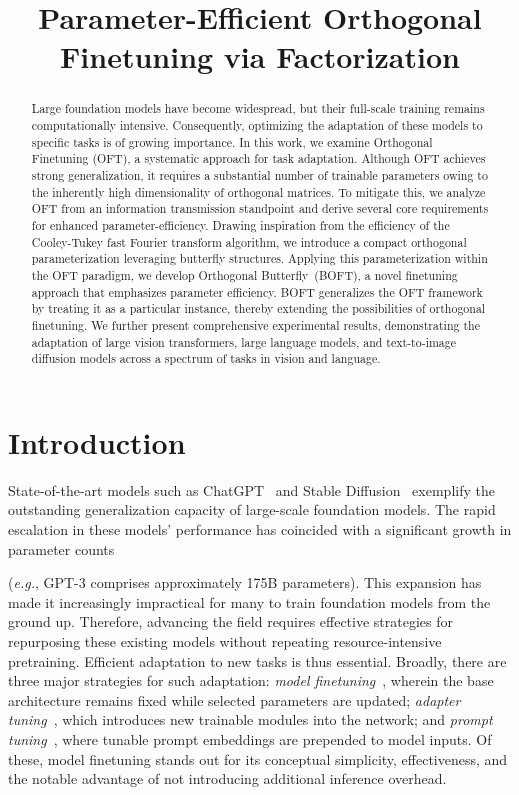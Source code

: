 \title{Parameter-Efficient Orthogonal Finetuning via Factorization}

\begin{abstract}
Large foundation models have become widespread, but their full-scale training remains computationally intensive. Consequently, optimizing the adaptation of these models to specific tasks is of growing importance. In this work, we examine Orthogonal Finetuning (OFT), a systematic approach for task adaptation. Although OFT achieves strong generalization, it requires a substantial number of trainable parameters owing to the inherently high dimensionality of orthogonal matrices. To mitigate this, we analyze OFT from an information transmission standpoint and derive several core requirements for enhanced parameter-efficiency. Drawing inspiration from the efficiency of the Cooley-Tukey fast Fourier transform algorithm, we introduce a compact orthogonal parameterization leveraging butterfly structures. Applying this parameterization within the OFT paradigm, we develop Orthogonal Butterfly~(BOFT), a novel finetuning approach that emphasizes parameter efficiency. BOFT generalizes the OFT framework by treating it as a particular instance, thereby extending the possibilities of orthogonal finetuning. We further present comprehensive experimental results, demonstrating the adaptation of large vision transformers, large language models, and text-to-image diffusion models across a spectrum of tasks in vision and language.
\end{abstract}

\section{Introduction}

State-of-the-art models such as ChatGPT~\cite{brown2020language,chen2021evaluating} and Stable Diffusion~\cite{rombach2022high} exemplify the outstanding generalization capacity of large-scale foundation models. The rapid escalation in these models' performance has coincided with a significant growth in parameter counts

(\emph{e.g.}, GPT-3 comprises approximately 175B parameters). This expansion has made it increasingly impractical for many to train foundation models from the ground up. Therefore, advancing the field requires effective strategies for repurposing these existing models without repeating resource-intensive pretraining. Efficient adaptation to new tasks is thus essential. Broadly, there are three major strategies for such adaptation: \emph{model finetuning}~\cite{hulora2022,zaken2022bitfit,guo2020parameter,raffel2020exploring,qiu2023controlling,zhang2022adaptive,chavan2023one}, wherein the base architecture remains fixed while selected parameters are updated; \emph{adapter tuning}~\cite{rebuffi2017learning,houlsby2019parameter,pfeiffer2020adapterfusion,lin2020exploring,he2021towards}, which introduces new trainable modules into the network; and \emph{prompt tuning}~\cite{li2021prefix,lester2021power}, where tunable prompt embeddings are prepended to model inputs. Of these, model finetuning stands out for its conceptual simplicity, effectiveness, and the notable advantage of not introducing additional inference overhead.

